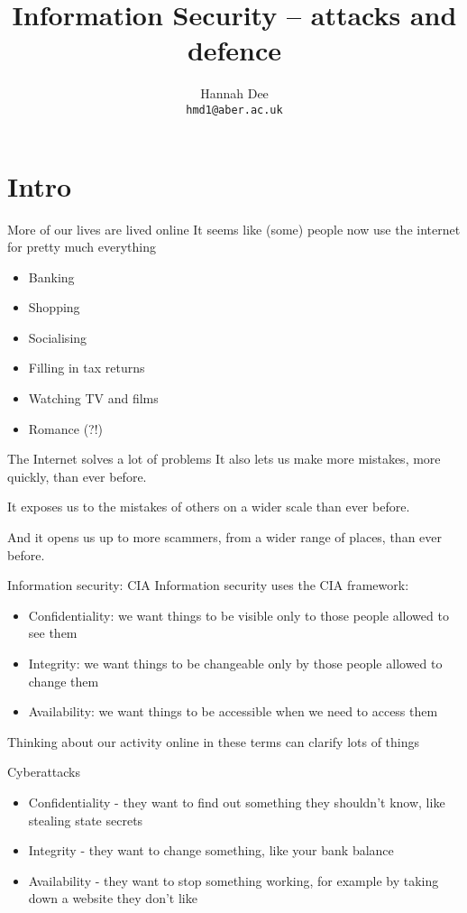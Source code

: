 \documentclass[xcolor=table]{beamer}
\title{Information Security -- attacks and defence}
\author[hmd1]{Hannah Dee \\
  \texttt{hmd1@aber.ac.uk}}
\date{}
\institute[]{U3A Aberystwyth, April 2023\\
  Aberystwyth University, Department of Computer Science}
\begin{document}
\begin{frame}
  \titlepage
\end{frame}


\section{Intro}

\begin{frame}{More of our lives are lived online}
	It seems like (some) people now use the internet for pretty much everything
	\begin{itemize}
		\item Banking
		\item Shopping
		\item Socialising 
		\item Filling in tax returns
		\item Watching TV and films 
		\item Romance (?!) 
	\end{itemize}
\end{frame}
\begin{frame}{The Internet solves a lot of problems}
	It also lets us make more mistakes, more quickly, than ever before.

	\vspace{0.5em}

	It exposes us to the mistakes of others on a wider scale than ever before.

	\vspace{0.5em}

	And it opens us up to more scammers, from a wider range of places, than ever before.
\end{frame}
\begin{frame}{Information security: CIA}
	Information security uses the CIA framework:
	\begin{itemize}
		\item Confidentiality: we want things to be visible only to those people allowed to see them
		\item Integrity: we want things to be changeable only by those people allowed to change them 
		\item Availability: we want things to be accessible when we need to access them
	\end{itemize}
	Thinking about our activity online in these terms can clarify lots of things
\end{frame}
\begin{frame}{Cyberattacks}
	\begin{itemize}
		\item Confidentiality - they want to find out something they shouldn't know, like stealing state secrets
		\item Integrity - they want to change something, like your bank balance
		\item Availability - they want to stop something working, for example by taking down a website they don't like
	\end{itemize}
\end{frame}
\end{document}
